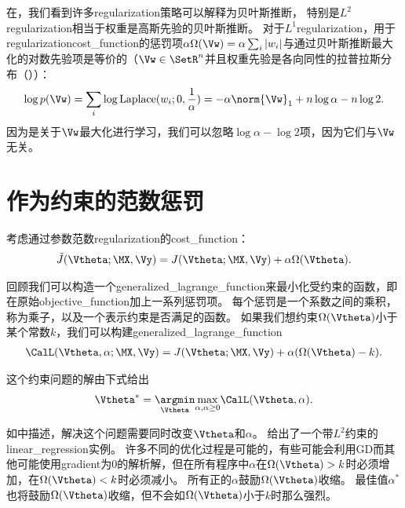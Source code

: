 在，我们看到许多\gls{regularization}策略可以解释为贝叶斯推断，
特别是$L^2$\gls{regularization}相当于权重是高斯先验的贝叶斯推断。
对于$L^1$\gls{regularization}，用于\gls{regularization}\gls{cost_function}的惩罚项$\alpha \Omega(\Vw) =  \alpha \sum_i |w_i |$与通过贝叶斯推断最大化的对数先验项是等价的（$\Vw \in \SetR^n$并且权重先验是各向同性的拉普拉斯分布（））：
\begin{align}
\log p(\Vw) = \sum_i \log \text{Laplace}(w_i;0,\frac{1}{\alpha}) = 
  -\alpha \norm{\Vw}_1 + n \log \alpha - n \log 2.
\end{align}
因为是关于$\Vw$最大化进行学习，我们可以忽略$\log \alpha - \log 2$项，因为它们与$\Vw$无关。
 
 
 \section{作为约束的范数惩罚}
 \label{sec:7.2}
考虑通过参数范数\gls{regularization}的\gls{cost_function}：
\begin{align}
 \tilde{J}(\Vtheta;\MX, \Vy) = J(\Vtheta;\MX, \Vy) + \alpha \Omega(\Vtheta) .
\end{align}

回顾我们可以构造一个\gls{generalized_lagrange_function}来最小化受约束的函数，即在原始\gls{objective_function}加上一系列惩罚项。
每个惩罚是一个系数之间的乘积，称为乘子，以及一个表示约束是否满足的函数。
如果我们想约束$\Omega(\Vtheta)$小于某个常数$k$，我们可以构建\gls{generalized_lagrange_function}
\begin{align}
 \CalL(\Vtheta, \alpha; \MX, \Vy) = J(\Vtheta; \MX, \Vy) + \alpha (\Omega(\Vtheta) - k).
\end{align}

这个约束问题的解由下式给出
\begin{align}
 \Vtheta^* = \underset{\Vtheta}{ \argmin} \underset{\alpha, \alpha \geq 0}{\max} \CalL(\Vtheta, \alpha).
\end{align}

如中描述，解决这个问题需要同时改变$\Vtheta$和$\alpha$。
给出了一个带$L^2$约束的\gls{linear_regression}实例。
许多不同的优化过程是可能的，有些可能会利用\gls{GD}而其他可能使用\gls{gradient}为0的解析解，但在所有程序中$\alpha$在$\Omega(\Vtheta) > k$时必须增加，在$\Omega(\Vtheta) < k$时必须减小。
所有正的$\alpha$鼓励$\Omega(\Vtheta)$收缩。
最佳值$\alpha^*$也将鼓励$\Omega(\Vtheta)$收缩，但不会如$\Omega(\Vtheta)$小于$k$时那么强烈。

